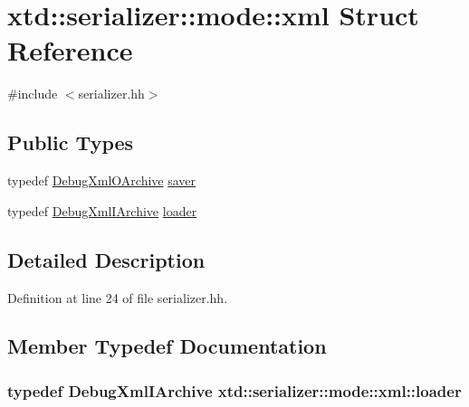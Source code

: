 \hypertarget{structxtd_1_1serializer_1_1mode_1_1xml}{\section{xtd\-:\-:serializer\-:\-:mode\-:\-:xml Struct Reference}
\label{structxtd_1_1serializer_1_1mode_1_1xml}
}


{\ttfamily \#include $<$serializer.\-hh$>$}

\subsection*{Public Types}
\begin{DoxyCompactItemize}
\item 
typedef \hyperlink{classxtd_1_1serializer_1_1DebugXmlOArchive}{Debug\-Xml\-O\-Archive} \hyperlink{structxtd_1_1serializer_1_1mode_1_1xml_a630743906b9808c209a9d7bce84427bc}{saver}
\item 
typedef \hyperlink{classxtd_1_1serializer_1_1DebugXmlIArchive}{Debug\-Xml\-I\-Archive} \hyperlink{structxtd_1_1serializer_1_1mode_1_1xml_a645aca92f671ad196a17282c44a69a83}{loader}
\end{DoxyCompactItemize}


\subsection{Detailed Description}


Definition at line 24 of file serializer.\-hh.



\subsection{Member Typedef Documentation}
\hypertarget{structxtd_1_1serializer_1_1mode_1_1xml_a645aca92f671ad196a17282c44a69a83}{
\subsubsection[{loader}]{\setlength{\rightskip}{0pt plus 5cm}typedef {\bf Debug\-Xml\-I\-Archive} {\bf xtd\-::serializer\-::mode\-::xml\-::loader}}}\label{structxtd_1_1serializer_1_1mode_1_1xml_a645aca92f671ad196a17282c44a69a83}


